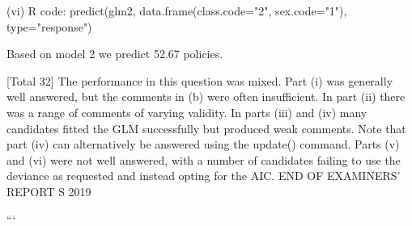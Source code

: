 (vi)
R code:
predict(glm2, data.frame(class.code="2", sex.code="1"),
type="response")

Based on model 2 we predict 52.67 policies.

[Total 32]
The performance in this question was mixed. Part (i) was generally well answered, but the
comments in (b) were often insufficient. In part (ii) there was a range of comments of
varying validity. In parts (iii) and (iv) many candidates fitted the GLM successfully but
produced weak comments. Note that part (iv) can alternatively be answered using the
update() command. Parts (v) and (vi) were not well answered, with a number of
candidates failing to use the deviance as requested and instead opting for the AIC.
END OF EXAMINERS’ REPORT
S 2019

```
